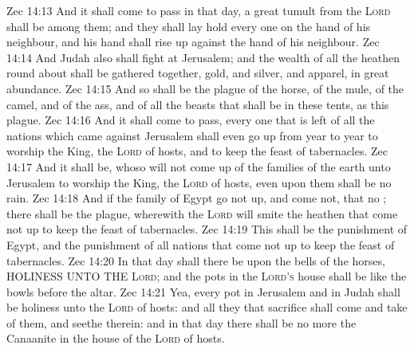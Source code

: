 \vs Zec 14:13 And it shall come to pass in that day,  a great tumult from the \textsc{Lord} shall be among them; and they shall lay hold every one on the hand of his neighbour, and his hand shall rise up against the hand of his neighbour.
\vs Zec 14:14 And Judah also shall fight at Jerusalem; and the wealth of all the heathen round about shall be gathered together, gold, and silver, and apparel, in great abundance.
\vs Zec 14:15 And so shall be the plague of the horse, of the mule, of the camel, and of the ass, and of all the beasts that shall be in these tents, as this plague.
\vs Zec 14:16 And it shall come to pass,  every one that is left of all the nations which came against Jerusalem shall even go up from year to year to worship the King, the \textsc{Lord} of hosts, and to keep the feast of tabernacles.
\vs Zec 14:17 And it shall be,  whoso will not come up of  the families of the earth unto Jerusalem to worship the King, the \textsc{Lord} of hosts, even upon them shall be no rain.
\vs Zec 14:18 And if the family of Egypt go not up, and come not, that  no ; there shall be the plague, wherewith the \textsc{Lord} will smite the heathen that come not up to keep the feast of tabernacles.
\vs Zec 14:19 This shall be the punishment of Egypt, and the punishment of all nations that come not up to keep the feast of tabernacles.
\vs Zec 14:20 In that day shall there be upon the bells of the horses, HOLINESS UNTO THE \textsc{Lord}; and the pots in the \textsc{Lord's} house shall be like the bowls before the altar.
\vs Zec 14:21 Yea, every pot in Jerusalem and in Judah shall be holiness unto the \textsc{Lord} of hosts: and all they that sacrifice shall come and take of them, and seethe therein: and in that day there shall be no more the Canaanite in the house of the \textsc{Lord} of hosts.

